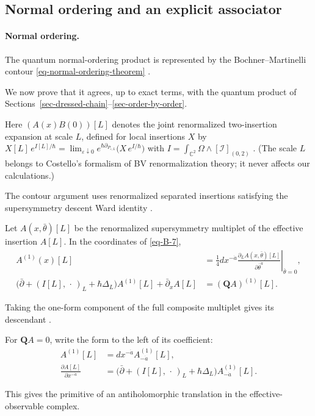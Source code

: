 \documentclass[11pt]{article}
\numberwithin{equation}{section}
\numberwithin{figure}{section}
\numberwithin{table}{section}
\begin{document}
\subsection{Normal ordering and an explicit associator}\label{sec-normal-ordering}

\paragraph{Normal ordering.}\label{quantum-normal-ordering}

The quantum normal-ordering product is represented by the Bochner--Martinelli contour \eqref{eq-normal-ordering-theorem} \cite[Section 2.3]{semichiral}.

We now prove that it agrees, up to exact terms, with the quantum product of Sections~\ref{sec-dressed-chain}--\ref{sec-order-by-order}.

Here $(A(x)B(0))[L]$ denotes the joint renormalized two-insertion expansion at scale $L$, defined for local insertions $X$ by $X[L]\,e^{I[L]/\hbar}=\lim_{\varepsilon\downarrow0}e^{\hbar\partial_{P_{\varepsilon,L}}}\bigl(X\,e^{I/\hbar}\bigr)$ with $I=\int_{\mathbb C^2}\Omega\wedge[\mathcal I]_{(0,2)}$ \cite{Costello}. (The scale $L$ belongs to Costello's formalism of BV renormalization theory; it never affects our calculations.)

The contour argument uses renormalized separated insertions satisfying the supersymmetry descent Ward identity \cite[Sections 2.2--2.3]{semichiral}.

Let $A(x,\bar\theta)[L]$ be the renormalized supersymmetry multiplet of the effective insertion $A[L]$. In the coordinates of \eqref{eq-B-7},
\begin{equation}\label{eq-ring-descendant}
\begin{aligned}
A^{(1)}(x)[L]
&=\frac14dx^{-\dot a}
\left.\frac{\partial_L A(x,\bar\theta)[L]}{\partial\bar\theta^{\dot a}}
\right|_{\bar\theta=0},\\
\bigl(\bar\partial+(I[L],\,\cdot\,)_L+\hbar\Delta_L\bigr)
A^{(1)}[L]+\bar\partial_x A[L]&=(\mathbf QA)^{(1)}[L].
\end{aligned}
\end{equation}

Taking the one-form component of the full composite multiplet gives its descendant \cite[Section 2.2]{semichiral}.

\begin{proofbox}
For $\mathbf QA=0$, write the form to the left of its coefficient:
\begin{equation}\label{eq-ring-descendant-component}
\begin{aligned}
A^{(1)}[L]&=dx^{-\dot a}A^{(1)}_{-\dot a}[L],\\
\frac{\partial A[L]}{\partial x^{-\dot a}}
&=\bigl(\bar\partial+(I[L],\,\cdot\,)_L+\hbar\Delta_L\bigr)
A^{(1)}_{-\dot a}[L].
\end{aligned}
\end{equation}

This gives the primitive of an antiholomorphic translation in the effective-observable complex.
\end{proofbox}
\end{document}
